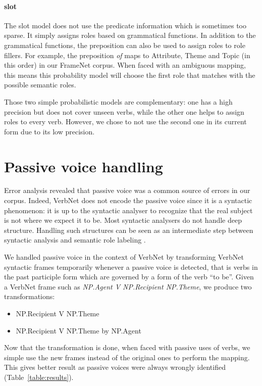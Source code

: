 \paragraph{slot}

The slot model does not use the predicate information which is sometimes too
sparse. It simply assigns roles based on grammatical functions. In addition to
the grammatical functions, the preposition can also be used to assign roles to
role fillers. For example, the preposition \textit{of} maps to Attribute, Theme
and Topic (in this order) in our FrameNet corpus. When faced with an ambiguous
mapping, this means this probability model will choose the first role that
matches with the possible semantic roles.

Those two simple probabilistic models are complementary: one has a high
precision but does not cover unseen verbs, while the other one helps to assign
roles to every verb. However, we chose to not use the second one in its current form due to its low
precision.

\section{Passive voice handling}

Error analysis revealed that passive voice was a common source of errors in our
corpus. Indeed, VerbNet does not encode the passive voice since it is a
syntactic phenomenon: it is up to the syntactic analyser to recognize that the
real subject is not where we expect it to be. Most syntactic analysers do not
handle deep structure. Handling such structures can be seen as an intermediate
step between syntactic analysis and semantic role labeling
\citep{bonfante2011modular,ribeyre2013systeme}.

We handled passive voice in the context of VerbNet by transforming VerbNet
syntactic frames temporarily whenever a passive voice is detected, that is
verbs in the past participle form which are governed by a form of the verb ``to
be''. Given a VerbNet frame such as \textit{NP.Agent V NP.Recipient NP.Theme},
we produce two transformations:

\begin{itemize}
    \item NP.Recipient V NP.Theme
    \item NP.Recipient V NP.Theme by NP.Agent
\end{itemize}

Now that the transformation is done, when faced with passive uses of verbs, we
simple use the new frames instead of the original ones to perform the mapping.
This gives better result as passive voices were always wrongly identified
(Table~\ref{table:results}).

